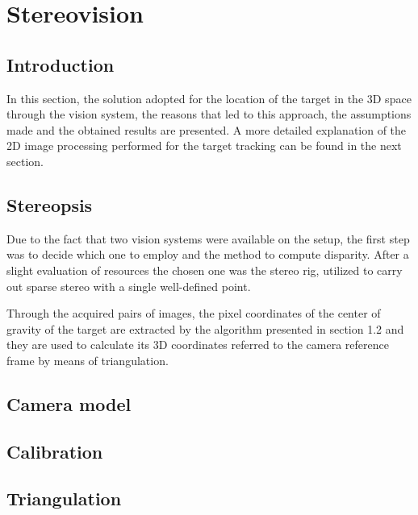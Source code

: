 
\section{Stereovision} %
\label{sec:stereopsis}

\subsection{Introduction}
In this section, the solution adopted for the location of the target in the 3D space through the vision system, the reasons that led to this approach, the assumptions made and the obtained results are presented. A more detailed explanation of the 2D image processing performed for the target tracking can be found in the next section.

\subsection{Stereopsis}
Due to the fact that two vision systems were available on the setup, the first step was to decide which one to employ and the method to compute disparity. After a slight evaluation of resources the chosen one was the stereo rig, utilized to carry out sparse stereo with a single well-defined point. 

Through the acquired pairs of images, the pixel coordinates of the center of gravity of the target are extracted by the algorithm presented in section 1.2 and they are used to calculate its 3D coordinates referred to the camera reference frame by means of triangulation.

\subsection{Camera model}


\subsection{Calibration}

\subsection{Triangulation}


